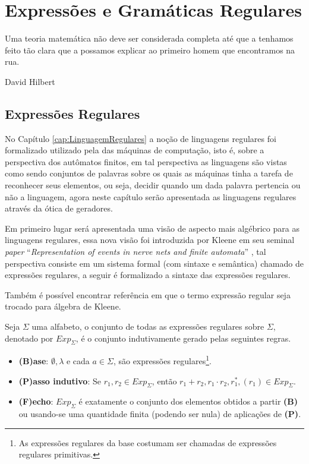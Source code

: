 \chapter{Expressões e Gramáticas Regulares}\label{cap:GramáticasRegulares}

\epigraph{Uma teoria matemática não deve ser considerada completa até que a tenhamos feito tão clara que a possamos explicar ao primeiro homem que encontramos na rua.}{David Hilbert}

\section{Expressões Regulares}\label{sec:ExpressaoRegulares}

No Capítulo \ref{cap:LinguagemRegulares} a noção de linguagens regulares foi formalizado utilizado pela das máquinas de computação, isto é, sobre a perspectiva dos autômatos finitos, em tal perspectiva as linguagens são vistas como sendo conjuntos de palavras sobre os quais as máquinas tinha a tarefa de reconhecer seus elementos, ou seja, decidir quando um dada palavra pertencia ou não a linguagem, agora neste capítulo serão apresentada as linguagens regulares através da ótica de geradores.

Em primeiro lugar será apresentada uma visão de aspecto mais algébrico para as linguagens regulares, essa nova visão foi introduzida por Kleene em seu seminal \textit{paper} ``\textit{Representation of events in nerve nets and finite automata}'' \cite{kleene1951}, tal perspectiva consiste em um sistema formal (com sintaxe e semântica) chamado de expressões  regulares, a seguir é formalizado a sintaxe das expressões regulares.

\begin{remark}
	Também é possível encontrar referência em que o termo expressão regular seja trocado para álgebra de Kleene.
\end{remark}

\begin{definition}\label{def:ExpRegularesSintaxe}
	Seja $\Sigma$ uma alfabeto, o conjunto de todas as expressões regulares sobre $\Sigma$, denotado por $Exp_\Sigma$, é o conjunto indutivamente gerado pelas seguintes regras.
	\begin{itemize}
		\item[ ]\textbf{(B)ase}: $\emptyset, \lambda$ e cada $a \in \Sigma$, são expressões regulares\footnote{As expressões regulares da base costumam ser chamadas de expressões regulares primitivas.}.
		\item[ ]\textbf{(P)asso indutivo}:  Se $r_1, r_2 \in Exp_\Sigma$, então $r_1 + r_2, r_1 \cdot r_2, r_1^*, (r_1) \in Exp_\Sigma$.
		\item[ ]\textbf{(F)echo}: $Exp_\Sigma$ é exatamente o conjunto dos elementos obtidos a partir \textbf{(B)} ou usando-se uma quantidade finita (podendo ser nula) de aplicações de \textbf{(P)}.
	\end{itemize}
\end{definition}

